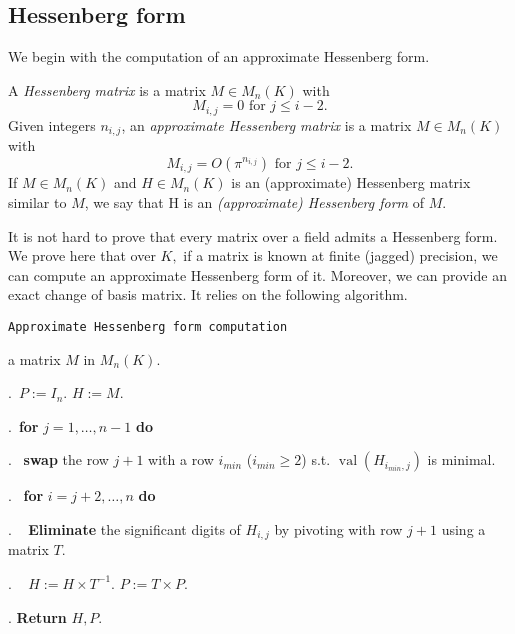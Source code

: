\documentclass{sig-alternate-05-2015}
\DeclareMathOperator{\val}{val}
\begin{document}
\subsection{Hessenberg form}

We begin with the computation of
an approximate Hessenberg form.

\begin{deftn}
A \emph{Hessenberg matrix} is a matrix $M \in M_n(K)$ with
\[
M_{i,j}=0 \mbox{ for $j \le i-2$.}
\]
Given integers $n_{i,j}$, an \emph{approximate Hessenberg matrix}
is a matrix $M \in M_n(K)$ with
\[
M_{i,j} = O(\pi^{n_{i,j}}) \mbox{ for $j \le i-2$.}
\]
If $M \in M_n (K)$ and $H \in M_n (K)$ is an (approximate) Hessenberg matrix
similar to $M$, we say that H is an \emph{(approximate) Hessenberg form} of $M.$
\end{deftn}

It is not hard to prove that every matrix over a field admits
a Hessenberg form.
We prove here that over $K,$ if a matrix is 
known at finite (jagged) precision,
we can compute an approximate Hessenberg form of it.
Moreover, we can provide an exact change of basis matrix.
It relies on the following algorithm.


\noindent\hrulefill

 {\tt Approximate Hessenberg form computation}

 a matrix $M$ in $M_n(K).$

\smallskip

.\ $P:=I_n.$ \: $H:=M.$


.\ {\bf for} $j=1,\dots,n-1$ {\bf do} 

.\  \:  {\bf swap} the row $j+1$ with a row $i_{min}$ ($i_{min} \geq 2$) s.t. $\val(H_{i_{min},j})$ is minimal. 

.\  \:  {\bf for} $i=j+2,\dots,n$ {\bf do} 

. \ \: \:  \textbf{Eliminate} the significant digits of $H_{i,j}$ by pivoting with row $j+1$ 
using a matrix $T.$

. \ \: \:  $H:=H \times T^{-1}.$ \: $P:=T \times P.$

. \textbf{Return} $H,P.$

\vspace{-1ex}\noindent\hrulefill

\medskip
\end{document}
